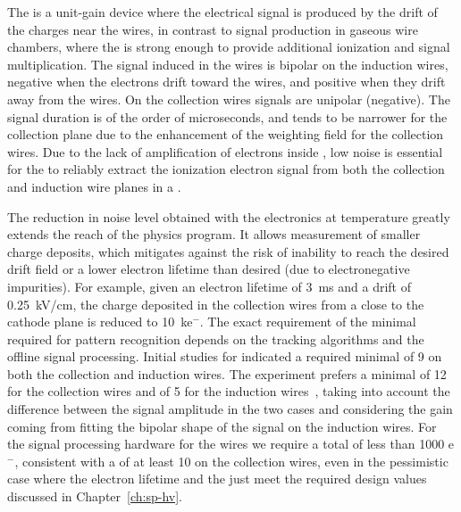 The    is a unit-gain device where the 
electrical signal is produced by the drift of the charges near the wires, 
in contrast to signal production in gaseous wire 
chambers, where the \efield is strong enough to provide additional
ionization and signal multiplication. The signal induced in the 
 wires is bipolar on the induction wires, negative when the
electrons drift toward the wires, and positive when they drift away from
the wires. On the collection wires signals are unipolar (negative).
The signal duration is of the order of microseconds, and tends to be narrower
for the collection plane due to the enhancement of the weighting field for
the collection wires. Due to the lack of amplification of 
electrons inside , low noise  is
essential for the  to reliably extract the ionization electron signal from both the 
collection and induction wire planes in a  . 

The reduction in noise level obtained with the  electronics at  temperature greatly 
extends the reach of the  physics program. %
It allows measurement of smaller charge deposits, which mitigates against the risk of %
inability to reach the desired drift field %
or %
a lower electron lifetime %
than desired (due to %
electronegative impurities). %
For example, given an electron lifetime of \SI{3}{ms} and a drift \efield
of \SI{0.25}{kV/cm}, the charge deposited in the collection wires from a 
 close to the cathode plane is reduced to \SI{10}{k}{e$^-$}.
The exact requirement of the minimal  required for pattern
recognition depends on the tracking algorithms and %
the offline signal processing.
Initial studies for  indicated %
a required minimal  of \num{9} 
on both the collection and induction wires. %
The 
 experiment prefers a minimal  of \num{12} for the
collection wires and of \num{5} for the induction wires~\cite{bib:sbnddoc1921}, taking into account
the difference between the signal amplitude in the two cases and considering %
the gain coming from fitting the bipolar shape of the signal on the
induction wires. 
For the signal processing hardware for the  wires we require 
a total  of less than 1000 e$^-$, consistent with a 
of at least 10 on the collection wires, 
even in the pessimistic case  where the electron lifetime and the \efield just meet the required design values discussed in Chapter~\ref{ch:sp-hv}.

